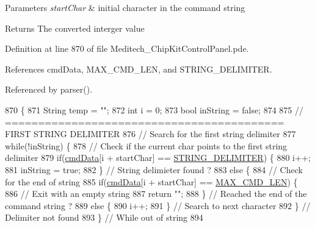 \begin{DoxyParams}{Parameters}
{\em start\-Char} & initial character in the command string \\
\hline
\end{DoxyParams}
\begin{DoxyReturn}{Returns}
The converted interger value 
\end{DoxyReturn}


Definition at line 870 of file Meditech\-\_\-\-Chip\-Kit\-Control\-Panel.\-pde.



References cmd\-Data, M\-A\-X\-\_\-\-C\-M\-D\-\_\-\-L\-E\-N, and S\-T\-R\-I\-N\-G\-\_\-\-D\-E\-L\-I\-M\-I\-T\-E\-R.



Referenced by parser().


\begin{DoxyCode}
870                                     \{
871   String temp = \textcolor{stringliteral}{""};
872   \textcolor{keywordtype}{int} i = 0;
873   \textcolor{keywordtype}{bool} inString = \textcolor{keyword}{false};
874   
875   \textcolor{comment}{// ========================================== FIRST STRING DELIMITER}
876   \textcolor{comment}{// Search for the first string delimiter}
877   \textcolor{keywordflow}{while}(!inString) \{
878     \textcolor{comment}{// Check if the current char points to the first string delimiter}
879     \textcolor{keywordflow}{if}(\hyperlink{_meditech___chip_kit_control_panel_8pde_afd31a444e0380e6be247c64cdb1510a9}{cmdData}[i + startChar] == \hyperlink{_command_processor_8h_a0f64fd8fb7385169ef53c7d2d49b02cc}{STRING\_DELIMITER}) \{
880       i++;
881       inString = \textcolor{keyword}{true};
882     \} \textcolor{comment}{// String delimieter found ?}
883     \textcolor{keywordflow}{else} \{
884       \textcolor{comment}{// Check for the end of string}
885       \textcolor{keywordflow}{if}(\hyperlink{_meditech___chip_kit_control_panel_8pde_afd31a444e0380e6be247c64cdb1510a9}{cmdData}[i + startChar] == \hyperlink{_command_processor_8h_a1eb73c104b484cf18752169509cebfe2}{MAX\_CMD\_LEN}) \{
886         \textcolor{comment}{// Exit with an empty string}
887         \textcolor{keywordflow}{return} \textcolor{stringliteral}{""};
888       \} \textcolor{comment}{// Reached the end of the command string ?}
889       \textcolor{keywordflow}{else} \{
890         i++;
891       \} \textcolor{comment}{// Search to next character}
892     \} \textcolor{comment}{// Delimiter not found}
893   \} \textcolor{comment}{// While out of string}
894 

\end{DoxyCode}
